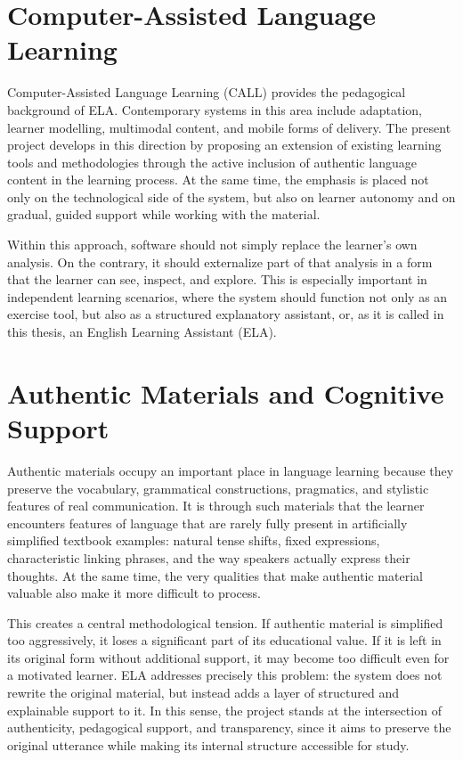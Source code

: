 \documentclass[12pt,a4paper,oneside]{report}
\begin{document}
\section{Computer-Assisted Language Learning}
Computer-Assisted Language Learning (CALL) provides the pedagogical background of ELA. Contemporary systems in this area include adaptation, learner modelling, multimodal content, and mobile forms of delivery. The present project develops in this direction by proposing an extension of existing learning tools and methodologies through the active inclusion of authentic language content in the learning process. At the same time, the emphasis is placed not only on the technological side of the system, but also on learner autonomy and on gradual, guided support while working with the material.

Within this approach, software should not simply replace the learner's own analysis. On the contrary, it should externalize part of that analysis in a form that the learner can see, inspect, and explore. This is especially important in independent learning scenarios, where the system should function not only as an exercise tool, but also as a structured explanatory assistant, or, as it is called in this thesis, an English Learning Assistant (ELA).

\section{Authentic Materials and Cognitive Support}
Authentic materials occupy an important place in language learning because they preserve the vocabulary, grammatical constructions, pragmatics, and stylistic features of real communication. It is through such materials that the learner encounters features of language that are rarely fully present in artificially simplified textbook examples: natural tense shifts, fixed expressions, characteristic linking phrases, and the way speakers actually express their thoughts. At the same time, the very qualities that make authentic material valuable also make it more difficult to process.

This creates a central methodological tension. If authentic material is simplified too aggressively, it loses a significant part of its educational value. If it is left in its original form without additional support, it may become too difficult even for a motivated learner. ELA addresses precisely this problem: the system does not rewrite the original material, but instead adds a layer of structured and explainable support to it. In this sense, the project stands at the intersection of authenticity, pedagogical support, and transparency, since it aims to preserve the original utterance while making its internal structure accessible for study.
\end{document}
